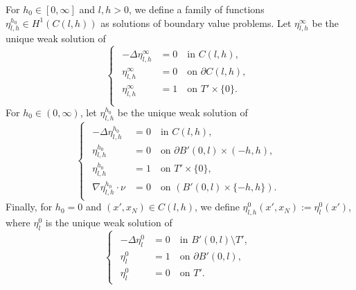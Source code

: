 \documentclass{article}
\numberwithin{equation}{section}
\theoremstyle{definition}
\theoremstyle{remark}
\begin{document}
For $h_0 \in [0, \infty]$ and $l, h > 0$, we define a family of functions $\eta_{l, h}^{h_0} \in H^1(C(l, h))$ as solutions of boundary value problems. Let $\eta_{l, h}^\infty$ be the unique weak solution of
\begin{equation} \label{eq:cell_problem_1}
    \begin{cases}
        \begin{aligned}
            -\Delta \eta_{l, h}^\infty &= 0 \quad \text{in } C(l, h), \\
            \eta_{l, h}^\infty &= 0 \quad \text{on } \partial C(l, h), \\
            \eta_{l, h}^\infty &= 1 \quad \text{on } T' \times \{0\}. \\
        \end{aligned}
    \end{cases}
\end{equation}
For $h_0 \in (0, \infty)$, let $\eta_{l, h}^{h_0}$ be the unique weak solution of
\begin{equation} \label{eq:cell_problem_2}
    \begin{cases}
        \begin{aligned}
            -\Delta \eta_{l, h}^{h_0} &= 0 \quad \text{in } C(l, h), \\
            \eta_{l, h}^{h_0} &= 0 \quad \text{on } \partial B'(0, l) \times (-h, h), \\
            \eta_{l, h}^{h_0} &= 1 \quad \text{on } T' \times \{0\}, \\
            \nabla \eta_{l, h}^{h_0} \cdot \nu &= 0 \quad \text{on } (B'(0, l) \times \{-h, h\}).
        \end{aligned}
    \end{cases}
\end{equation}
Finally, for $h_0 = 0$ and $(x', x_N) \in C(l, h)$, we define $\eta_{l, h}^0(x', x_N) := \eta_l^0(x')$, where $\eta_l^0$ is the unique weak solution of
\begin{equation} \label{eq:cell_problem_3}
    \begin{cases}
        \begin{aligned}
            -\Delta \eta_l^0 &= 0 \quad \text{in } B'(0, l) \setminus T', \\
            \eta_l^0 &= 1 \quad \text{on } \partial B'(0, l), \\
            \eta_l^0 &= 0 \quad \text{on } T'.
        \end{aligned}
    \end{cases}
\end{equation}
\end{document}
